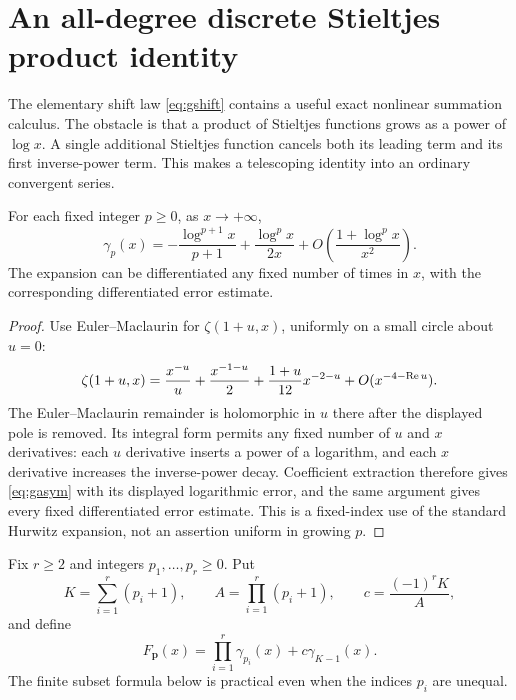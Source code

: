 \section{An all-degree discrete Stieltjes product identity}\label{sec:discrete}

The elementary shift law \eqref{eq:gshift} contains a useful exact
nonlinear summation calculus. The obstacle is that a product of Stieltjes
functions grows as a power of $\log x$. A single additional Stieltjes
function cancels both its leading term and its first inverse-power term.
This makes a telescoping identity into an ordinary convergent series.

\begin{lemma}\label{lem:gasym}
For each fixed integer $p\ge0$, as $x\to+\infty$,
\begin{equation}\label{eq:gasym}
 \gamma_p(x)=-\frac{\log^{p+1}x}{p+1}
       +\frac{\log^p x}{2x}
       +O\left(\frac{1+\log^p x}{x^2}\right).
\end{equation}
The expansion can be differentiated any fixed number of times in $x$,
with the corresponding differentiated error estimate.
\end{lemma}
\begin{proof}
Use Euler--Maclaurin for $\zeta(1+u,x)$, uniformly on a small circle
about $u=0$:
\[
 \zeta(1+u,x)=\frac{x^{-u}}u+
 \frac{x^{-1-u}}2+\frac{1+u}{12}x^{-2-u}
 +O(x^{-4-\operatorname{Re} u}).
\]
The Euler--Maclaurin remainder is holomorphic in $u$ there after the
displayed pole is removed. Its integral form permits any fixed number
of $u$ and $x$ derivatives: each $u$ derivative inserts a power of a
logarithm, and each $x$ derivative increases the inverse-power decay.
Coefficient extraction therefore gives \eqref{eq:gasym} with its
displayed logarithmic error, and the same argument gives every fixed
differentiated error estimate. This is a fixed-index use of the standard
Hurwitz expansion, not an assertion uniform in growing $p$.
\end{proof}

Fix $r\ge2$ and integers $p_1,\ldots,p_r\ge0$. Put
\begin{equation}\label{eq:product-K}
 K=\sum_{i=1}^r(p_i+1),\qquad
 A=\prod_{i=1}^r(p_i+1),\qquad c=\frac{(-1)^rK}{A},
\end{equation}
and define
\begin{equation}\label{eq:product-F}
 F_{\boldsymbol p}(x)=\prod_{i=1}^r\gamma_{p_i}(x)
                      +c\gamma_{K-1}(x).
\end{equation}
The finite subset formula below is practical even when the indices
$p_i$ are unequal.

